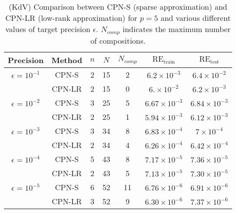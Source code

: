  
\begin{table}[h]
\centering %


\begin{tabular}{|c|c|c|c|c|c|c|}
\hline
{Precision} & {Method} & $n$ & $N$ & $N_{comp}$   & $ \text{RE}_{\text{train}} $  & $ \text{RE}_{\text{test}} $\\ \hline

\centering $\epsilon = 10^{-1}$ & CPN-S & 2 & 15 & 2 & $6.2 \times 10^{-3}$ & $6.4\times 10^{-2}$ \\ \cline{2-7}
                                
                                &  CPN-LR & 2 & 15 & 0 & $6. \times 10^{-2}$ & $6.2 \times 10^{-3}$ \\ \hline
$\epsilon = 10^{-2}$ &  CPN-S & 3 & 25 & 5 & $ 6.67 \times 10^{-3} $ & $ 6.84 \times 10^{-3} $\\ \cline{2-7}
                                
                        &  CPN-LR& 2 & 25 & 1 & $ 5.94 \times 10^{-3}$ & $ 6.12 \times 10^{-3}$ \\ \hline
$\epsilon = 10^{-3}$ &  CPN-S & 3 & 34 & 8 &  $ 6.83 \times 10^{-4} $ & $ 7 \times 10^{-4} $\\ \cline{2-7}
                                
                        &  CPN-LR & 2 & 34 & 4 & $ 6.26 \times 10^{-4} $ & $ 6.42 \times 10^{-4} $\\ \hline
$\epsilon = 10^{-4}$ &  CPN-S & 5 & 43 & 8 & $ 7.17 \times 10^{-5} $ & $ 7.36 \times 10^{-5}$  \\ \cline{2-7}
                                
                        &  CPN-LR & 2 & 43 & 5 & $ 7.13 \times 10^{-5} $ & $ 7.30 \times 10^{-5}$ \\ \hline
$\epsilon = 10^{-5}$ &  CPN-S & 6 & 52 & 11 & $ 6.76 \times 10^{-6}$ & $ 6.91 \times 10^{-6}$ \\ \cline{2-7}
                                
                        &  CPN-LR & 3 & 52 & 9 & 
 $ 6.30 \times 10^{-6} $ & $ 7.37 \times 10^{-6} $ \\ \hline
                                

\end{tabular}
\caption{(KdV) Comparison between CPN-S (sparse approximation) and CPN-LR (low-rank approximation) for $ p = 5 $ and various different values of target precision $\epsilon$. $N_{comp}$  indicates the maximum number of compositions.}
\label{tab:sparse_table}
\end{table}

